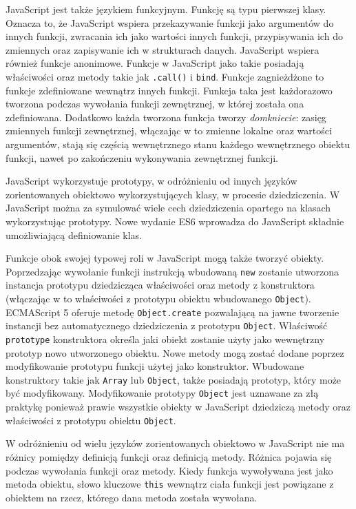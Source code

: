 JavaScript jest także językiem funkcyjnym. Funkcję są typu pierwszej klasy. Oznacza to, że JavaScript wspiera przekazywanie funkcji jako argumentów do innych funkcji, zwracania ich jako wartości innych funkcji, przypisywania ich do zmiennych oraz zapisywanie ich w strukturach danych. JavaScript wspiera również funkcje anonimowe\cite{fcfunctionWiki}. Funkcje w JavaScript jako takie posiadają właściwości oraz metody takie jak \verb|.call()| i \verb|bind|. Funkcje zagnieżdżone to funkcje zdefiniowane wewnątrz innych funkcji. Funkcja taka jest każdorazowo tworzona podczas wywołania funkcji zewnętrznej, w której została ona zdefiniowana. Dodatkowo każda tworzona funkcja tworzy \emph{domkniecie}: zasięg zmiennych funkcji zewnętrznej, włączając w to zmienne lokalne oraz wartości argumentów, stają się częścią wewnętrznego stanu każdego wewnętrznego obiektu funkcji, nawet po zakończeniu wykonywania zewnętrznej funkcji\cite{jsWiki}.

JavaScript wykorzystuje prototypy, w odróżnieniu od innych języków zorientowanych obiektowo wykorzystujących klasy, w procesie dziedziczenia. W JavaScript można za symulować wiele cech dziedziczenia opartego na klasach wykorzystując prototypy\cite{jsWiki}. Nowe wydanie ES6 wprowadza do JavaScript składnie umożliwiającą definiowanie klas.  

Funkcje obok swojej typowej roli w JavaScript mogą także tworzyć obiekty. Poprzedzając wywołanie funkcji instrukcją wbudowaną \verb|new| zostanie utworzona instancja prototypu dziedzicząca właściwości oraz metody z konstruktora (włączając w to właściwości z prototypu obiektu wbudowanego \verb|Object|). ECMAScript 5 oferuje metodę \verb|Object.create| pozwalającą na jawne tworzenie instancji bez automatycznego dziedziczenia z prototypu \verb|Object|. Właściwość \verb|prototype| konstruktora określa jaki obiekt zostanie użyty jako wewnętrzny prototyp nowo utworzonego obiektu. Nowe metody mogą zostać dodane poprzez modyfikowanie prototypu funkcji użytej jako konstruktor. Wbudowane konstruktory takie jak \verb|Array| lub \verb|Object|, także posiadają prototyp, który może być modyfikowany. Modyfikowanie prototypy \verb|Object| jest uznawane za złą praktykę ponieważ prawie wszystkie obiekty w JavaScript dziedziczą metody oraz właściwości z prototypu obiektu \verb|Object|\cite{jsWiki}.

W odróżnieniu od wielu języków zorientowanych obiektowo w JavaScript nie ma różnicy pomiędzy definicją funkcji oraz definicją metody. Różnica pojawia się podczas wywołania funkcji oraz metody. Kiedy funkcja wywoływana jest jako metoda obiektu, słowo kluczowe \verb|this| wewnątrz ciała funkcji jest powiązane z obiektem na rzecz, którego dana metoda została wywołana\cite{jsWiki}. 

